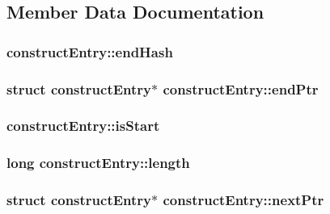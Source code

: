 \subsection{Member Data Documentation}
\hypertarget{structconstructEntry_abad5b7a2439647fec74a952e2313c72e}{
\subsubsection[{end\-Hash}]{ construct\-Entry\-::end\-Hash}}\label{structconstructEntry_abad5b7a2439647fec74a952e2313c72e}
\hypertarget{structconstructEntry_a1cd345344bca9d0dfea1becdbd88173a}{
\subsubsection[{end\-Ptr}]{\setlength{\rightskip}{0pt plus 5cm}struct {\bf construct\-Entry}$\ast$ construct\-Entry\-::end\-Ptr}}\label{structconstructEntry_a1cd345344bca9d0dfea1becdbd88173a}
\hypertarget{structconstructEntry_a54e2245ccb62d9e1200c2e2ca1609837}{
\subsubsection[{is\-Start}]{ construct\-Entry\-::is\-Start}}\label{structconstructEntry_a54e2245ccb62d9e1200c2e2ca1609837}
\hypertarget{structconstructEntry_abb8eec52a4f6d3d4afec6a96895cd1c5}{
\subsubsection[{length}]{\setlength{\rightskip}{0pt plus 5cm}long construct\-Entry\-::length}}\label{structconstructEntry_abb8eec52a4f6d3d4afec6a96895cd1c5}
\hypertarget{structconstructEntry_a014aabd66ca855b00e0285a241aeb5e9}{
\subsubsection[{next\-Ptr}]{\setlength{\rightskip}{0pt plus 5cm}struct {\bf construct\-Entry}$\ast$ construct\-Entry\-::next\-Ptr}}\label{structconstructEntry_a014aabd66ca855b00e0285a241aeb5e9}
